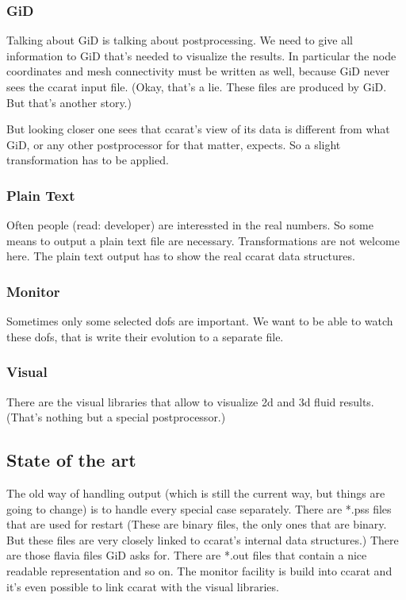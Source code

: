 \subsubsection{GiD}

Talking about GiD is talking about postprocessing. We need to give
all information to GiD that's needed to visualize the results. In
particular the node coordinates and mesh connectivity must be written
as well, because GiD never sees the ccarat input file. (Okay, that's
a lie. These files are produced by GiD. But that's another story.)

But looking closer one sees that ccarat's view of its data is different
from what GiD, or any other postprocessor for that matter, expects.
So a slight transformation has to be applied.


\subsubsection{Plain Text}

Often people (read: developer) are interessted in the real numbers.
So some means to output a plain text file are necessary. Transformations
are not welcome here. The plain text output has to show the real ccarat
data structures.


\subsubsection{Monitor}

Sometimes only some selected dofs are important. We want to be able
to watch these dofs, that is write their evolution to a separate file.


\subsubsection{Visual}

There are the visual libraries that allow to visualize 2d and 3d fluid
results. (That's nothing but a special postprocessor.)


\subsection{State of the art}

The old way of handling output (which is still the current way, but
things are going to change) is to handle every special case separately.
There are {*}.pss files that are used for restart (These are binary
files, the only ones that are binary. But these files are very closely
linked to ccarat's internal data structures.) There are those flavia
files GiD asks for. There are {*}.out files that contain a nice readable
representation and so on. The monitor facility is build into ccarat
and it's even possible to link ccarat with the visual libraries.


